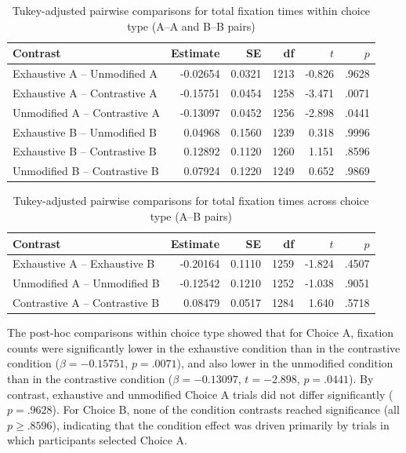 \documentclass[a4paper, ruler]{CUP-JNL-LIN}%
\begin{document}
\begin{table}[htbp]
\centering
\caption{Tukey-adjusted pairwise comparisons for total fixation times within choice type (A--A and B--B pairs)}
\label{tab:total-fixation-pairwise-within-choice}
\begin{tabularx}{\textwidth}{@{}Xrrrrr@{}}
\toprule
Contrast & Estimate & SE & df & $t$ & $p$ \\
\midrule
Exhaustive A -- Unmodified A   & -0.02654 & 0.0321 & 1213 & -0.826 & .9628 \\
Exhaustive A -- Contrastive A  & -0.15751 & 0.0454 & 1258 & -3.471 & .0071 \\
Unmodified A -- Contrastive A  & -0.13097 & 0.0452 & 1256 & -2.898 & .0441 \\
Exhaustive B -- Unmodified B   &  0.04968 & 0.1560 & 1239 &  0.318 & .9996 \\
Exhaustive B -- Contrastive B  &  0.12892 & 0.1120 & 1260 &  1.151 & .8596 \\
Unmodified B -- Contrastive B  &  0.07924 & 0.1220 & 1249 &  0.652 & .9869 \\
\bottomrule
\end{tabularx}
\end{table}

\begin{table}[htbp]
\centering
\caption{Tukey-adjusted pairwise comparisons for total fixation times across choice type (A--B pairs)}
\label{tab:total-fixation-pairwise-across-choice}
\begin{tabularx}{\textwidth}{@{}Xrrrrr@{}}
\toprule
Contrast & Estimate & SE & df & $t$ & $p$ \\
\midrule
Exhaustive A -- Exhaustive B   & -0.20164 & 0.1110 & 1259 & -1.824 & .4507 \\
Unmodified A -- Unmodified B   & -0.12542 & 0.1210 & 1252 & -1.038 & .9051 \\
Contrastive A -- Contrastive B &  0.08479 & 0.0517 & 1284 &  1.640 & .5718 \\
\bottomrule
\end{tabularx}
\end{table}

The post-hoc comparisons within choice type showed that for Choice A, fixation counts were significantly lower in the exhaustive condition than in the contrastive condition ($\beta=-0.15751$, $p=.0071$), and also lower in the unmodified condition than in the contrastive condition ($\beta=-0.13097$, $t=-2.898$, $p=.0441$). By contrast, exhaustive and unmodified Choice A trials did not differ significantly ($p=.9628$). For Choice B, none of the condition contrasts reached significance (all $p \ge .8596$), indicating that the condition effect was driven primarily by trials in which participants selected Choice A.
\end{document}
